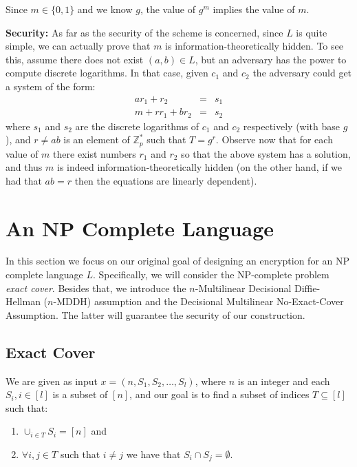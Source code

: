 \documentclass[12pt]{tufte-book}
\begin{document}
Since $m \in \{0,1\}$ and we know $g$, the value of $g^m$ implies the value of $m$.

\smallskip
\textbf{Security:}
As far as the security of the scheme is concerned, since $L$ is quite simple, we can actually prove that $m$ is information-theoretically hidden. To see this, assume there does not exist $(a,b) \in L$, but an adversary has the power to compute discrete logarithms. In that case, given $c_1$ and $c_2$ the adversary could get a system of the form:
\begin{eqnarray*}
ar_1 + r_2 & = & s_1 \\
m + r r_1 + b r_2 &=& s_2
\end{eqnarray*}
where $s_1$ and $s_2$ are   the discrete logarithms of $c_1$ and $c_2$ respectively (with base $g$), and $r \ne ab$ is an element of $  \mathbb{Z}_{p}^*$ such that $T = g^r$. Observe now that for each value of $m$ there exist numbers $r_1$ and $r_2$ so that the above system has a solution, and thus $m$ is indeed information-theoretically hidden (on the other hand, if we had that $ab = r$ then the equations are linearly dependent).

\newpage
\section{An  NP Complete Language }

In this section we focus on our original goal of designing an encryption for an NP complete language $L$. Specifically, we will consider the NP-complete problem \emph{exact cover}. Besides that, we introduce the $n$-Multilinear  Decisional Diffie-Hellman ($n$-MDDH) assumption  and the Decisional Multilinear No-Exact-Cover Assumption.  The latter will guarantee the security of our construction.

\subsection{ Exact Cover}

We are given as input $x = (n, S_1, S_2, \ldots, S_l)$, where $n$ is an integer and each $S_i, i \in [l]$ is a subset of $[n]$, and our goal is to find a subset of indices $T \subseteq [l]$ such that:

\begin{enumerate}
\item $\cup_{i \in T} S_i = [n] $ and

\item $\forall i, j \in T$ such that $i \ne j$ we have that $S_i \cap S_j = \emptyset$.
\end{enumerate}
\end{document}
